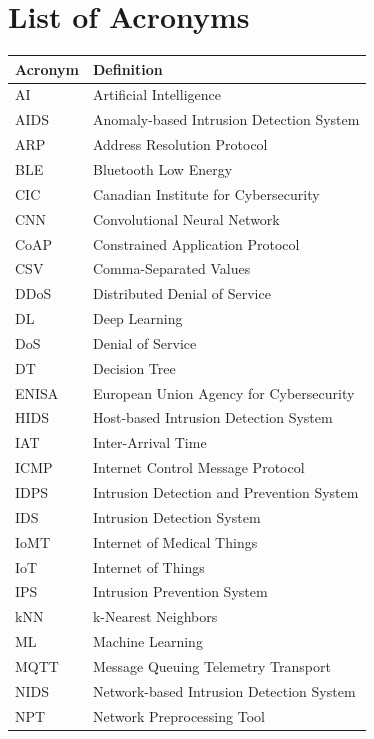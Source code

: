 \chapter*{List of Acronyms}

\begin{longtable}{@{}l l@{}}
\toprule
\textbf{Acronym} & \textbf{Definition} \\
\midrule
\endhead
AI      & Artificial Intelligence \\
AIDS    & Anomaly-based Intrusion Detection System \\
ARP     & Address Resolution Protocol \\
BLE     & Bluetooth Low Energy \\
CIC     & Canadian Institute for Cybersecurity \\
CNN     & Convolutional Neural Network \\
CoAP    & Constrained Application Protocol \\
CSV     & Comma-Separated Values \\
DDoS    & Distributed Denial of Service \\
DL      & Deep Learning \\
DoS     & Denial of Service \\
DT      & Decision Tree \\
ENISA   & European Union Agency for Cybersecurity \\
HIDS    & Host-based Intrusion Detection System \\
IAT     & Inter-Arrival Time \\
ICMP    & Internet Control Message Protocol \\
IDPS    & Intrusion Detection and Prevention System \\
IDS     & Intrusion Detection System \\
IoMT    & Internet of Medical Things \\
IoT     & Internet of Things \\
IPS     & Intrusion Prevention System \\
kNN     & k-Nearest Neighbors \\
ML      & Machine Learning \\
MQTT    & Message Queuing Telemetry Transport \\
NIDS    & Network-based Intrusion Detection System \\
NPT     & Network Preprocessing Tool \\

\end{longtable}
